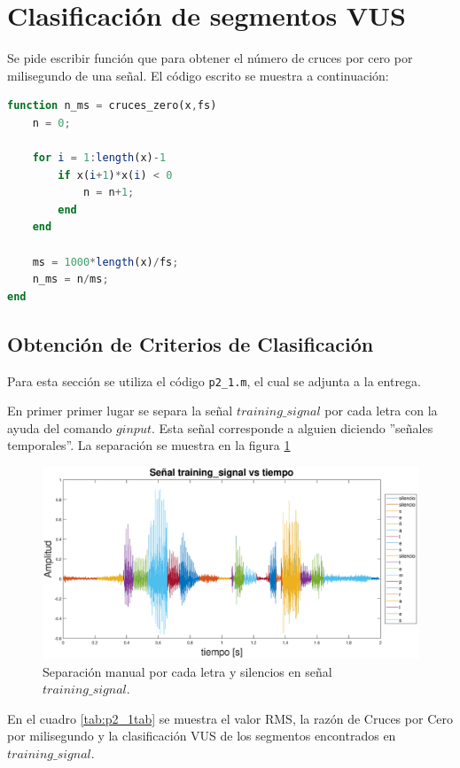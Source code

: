 \section{Clasificación de segmentos VUS}

Se pide escribir función que para obtener el número de cruces por cero por milisegundo de una señal. El código escrito se muestra a continuación:
\begin{lstlisting}[language = octave]
function n_ms = cruces_zero(x,fs)
    n = 0;
    
    for i = 1:length(x)-1
        if x(i+1)*x(i) < 0
            n = n+1;
        end
    end
    
    ms = 1000*length(x)/fs;
    n_ms = n/ms;    
end
\end{lstlisting}

\subsection{Obtención de Criterios de Clasificación}

Para esta sección se utiliza el código \texttt{p2\_1.m}, el cual se adjunta a la entrega.

En primer primer lugar se separa la señal $training\_signal$ por cada letra con la ayuda del comando $ginput$. Esta señal corresponde a alguien diciendo ''señales temporales''. La separación se muestra en la figura \ref{fig:p2_1clas}
\begin{figure}[H]
    \centering
    \includegraphics[width = .9\linewidth]{figures/p2_1separacion.eps}
    \caption{Separación manual por cada letra y silencios en señal $training\_signal$.}
    \label{fig:p2_1clas}
\end{figure}

En el cuadro \ref{tab:p2_1tab} se muestra el valor RMS, la razón de Cruces por Cero por milisegundo y la clasificación VUS de los segmentos encontrados en $training\_signal$.

